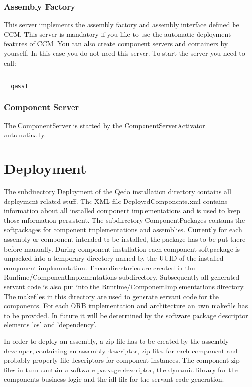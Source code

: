 \documentclass[12pt,a4paper]{report}
\begin{document}
\subsection{Assembly Factory}
\label{sec:AssemblyFactory}

This server implements the assembly factory and assembly interface defined be CCM. This server is mandatory if you like to use the automatic deployment features of CCM. You can also create component servers and containers by yourself. In this case you do not need this server. To start the server you need to call:

\small
\begin{verbatim}

  qassf

\end{verbatim}
\normalsize

\subsection{Component Server}
\label{sec:ComponentServer}

The ComponentServer is started by the ComponentServerActivator automatically.


\chapter{Deployment}
\label{sec:Deployment}
The subdirectory Deployment of the Qedo installation directory contains all deployment related stuff. The XML file DeployedComponents.xml contains information about all installed component implementations and is used to keep those information persistent. The subdirectory ComponentPackages contains the softpackages for component implementations and assemblies. Currently for each assembly or component intended to be installed, the package has to be put there before manually. During component installation each component softpackage is unpacked into a temporary directory named by the UUID of the installed component implementation. These directories are created in the Runtime/ComponentImplementations subdirectory. Subsequently all generated servant code is also put into the Runtime/ComponentImplementations directory. The makefiles in this directory are used to generate servant code for the components. For each ORB implementation and architecture an own makefile
has to be provided. In future it will be determined by the software package descriptor elements 'os' and 'dependency'.

In order to deploy an assembly, a zip file has to be created by the assembly developer, containing an assembly descriptor, zip files for each component  and probably property file descriptors for component instances. The component zip files in turn contain a software package descriptor, the dynamic library for the components business logic and the idl file for the servant code generation.
\end{document}
